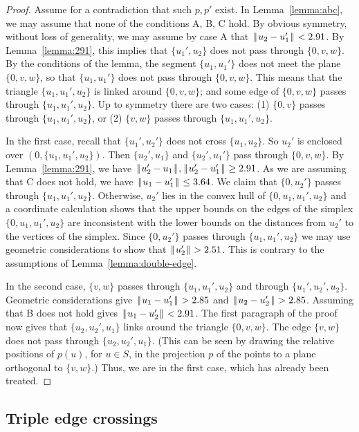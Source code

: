 \documentclass[11pt]{amsart}
\def\|{{\hskip0.1em|\hskip-0.15em|\hskip0.1em}}
\begin{document}
\begin{proof}  Assume for a contradiction that such $p,p'$ exist.
In Lemma~\ref{lemma:abc}, we may assume that none of the
conditions A, B, C hold.  By obvious symmetry, without loss of generality, we may assume by case A
that $\|u_2-u_1'\|<2.91$.  By Lemma~\ref{lemma:291}, this implies that $\{u_1',u_2\}$ does not pass through $\{0,v,w\}$.  By the conditions of the lemma, the segment $\{u_1,u_1'\}$ does not meet the plane $\{0,v,w\}$, so that $\{u_1,u_1'\}$ does not pass through $\{0,v,w\}$.  This means that the triangle $\{u_1,u_1',u_2\}$ is linked around $\{0,v,w\}$; and  some edge of $\{0,v,w\}$ passes through $\{u_1,u_1',u_2\}$.  Up to symmetry there are two cases: (1) $\{0,v\}$ passes through $\{u_1,u_1',u_2\}$, or (2) $\{v,w\}$ passes through $\{u_1,u_1',u_2\}$.

In the first case, recall that $\{u_1',u_2'\}$ does not cross $\{u_1,u_2\}$.
So $u_2'$ is enclosed over $(0,\{u_1,u_1',u_2\})$.  Then $\{u_2',u_1\}$
and $\{u_2',u_1'\}$ pass through $\{0,v,w\}$.  By Lemma~\ref{lemma:291}, we
have $\|u_2'-u_1\|,\|u_2'-u_1'\|\ge 2.91$.  As we are assuming that C does not hold, we have $\|u_1-u_1'\|\le 3.64$.  We claim that $\{0,u_2'\}$
passes through $\{u_1,u_1',u_2\}$.  Otherwise, $u_2'$ lies in the convex hull of $\{0,u_1,u_1',u_2\}$ and a coordinate calculation shows that the upper bounds on the edges of the simplex $\{0,u_1,u_1',u_2\}$ are inconsistent with the lower bounds on the distances from $u_2'$ to the vertices of the simplex.  Since $\{0,u_2'\}$ passes through $\{u_1,u_1',u_2\}$ we may use geometric considerations to show that $\|u_2'\| > 2.51$.  This is contrary to the assumptions of Lemma~\ref{lemma:double-edge}.

In the second case, $\{v,w\}$ passes through $\{u_1,u_1',u_2\}$ and through $\{u_1',u_2',u_2\}$.  Geometric considerations give $\|u_1-u_1'\|>2.85$ and $\|u_2-u_2'\|> 2.85$.  Assuming that B does not hold gives $\|u_1-u_2'\|< 2.91$.  The first paragraph of the proof now gives that $\{u_2,u_2',u_1\}$ links around the triangle $\{0,v,w\}$.  The edge $\{v,w\}$ does not pass through $\{u_2,u_2',u_1\}$.  (This can be seen by drawing the relative positions of $p(u)$, for $u\in S$, in the projection $p$ of the points to a plane orthogonal to $\{v,w\}$.)  Thus, we are in the first case, which has already been treated.
\end{proof}

\subsection*{Triple edge crossings}
\end{document}
